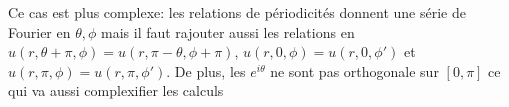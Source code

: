     \begin{TODO}
      Ce cas est plus complexe: les relations de périodicités donnent une série de Fourier en \(\theta,\phi\) mais il faut rajouter aussi les relations en \(u(r,\theta+\pi,\phi) = u(r,\pi-\theta,\phi + \pi)\), \(u(r,0,\phi) = u(r,0,\phi')\) et \(u(r,\pi,\phi) = u(r,\pi,\phi')\). De plus, les \(e^{i\theta}\) ne sont pas orthogonale sur \([0,\pi]\) ce qui va aussi complexifier les calculs
    \end{TODO}
